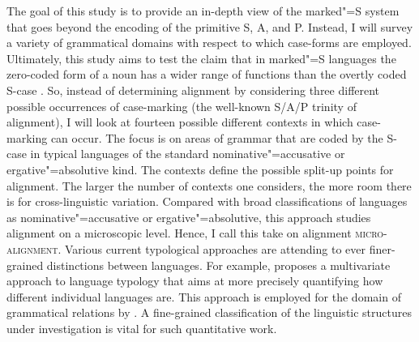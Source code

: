 The goal of this study is to provide an in-depth view of the marked"=S system that goes beyond the encoding of the primitive  S, A, and P. 
Instead, I will survey a variety of grammatical domains with respect to which case-forms are employed. 
Ultimately, this study aims to test the claim that in marked"=S languages the zero-coded form of a noun has a wider range of functions than the overtly coded S-case \citep{Koenig:2006}. 
So, instead of determining alignment by considering three different possible occurrences of case-marking (the well-known S/A/P trinity of alignment), I will look at fourteen possible different contexts in which case-marking can occur.
The focus is on areas of grammar that are coded by the S-case in typical languages of the standard nominative"=accusative or ergative"=absolutive kind.   
The contexts define the possible split-up points for alignment.
The larger the number of contexts one considers, the more room there is for cross-linguistic variation.
Compared with broad classifications of languages as nominative"=accusative or ergative"=absolutive, this approach studies alignment on a microscopic level.
Hence, I call this take on alignment \textsc{micro-alignment}. 
Various current typological approaches are attending to ever finer-grained distinctions between languages.
For example, \citet{Bickel:2007} proposes a multivariate approach to language typology that aims at more precisely quantifying how different individual languages are. 
This approach is employed for the domain of grammatical relations by \citet{Witzlack:2010}.
A fine-grained classification of the linguistic structures under investigation is vital for such quantitative work.


